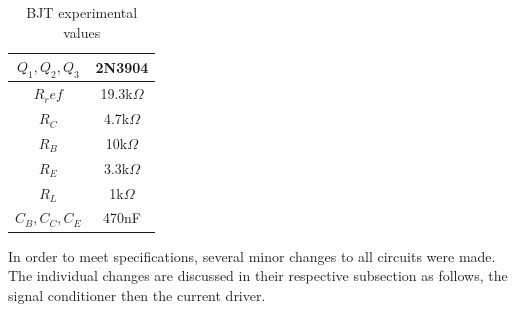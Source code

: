 \begin{table}[H]
	\centering
	\caption{BJT experimental values}
	\label{tab:bjtexp}
	\begin{tabular}{cc}
		$Q_1, Q_2, Q_3$ & 2N3904        \\ \hline
		$R_ref$         & 19.3k$\Omega$ \\ \hline
		$R_C$           & 4.7k$\Omega$  \\ \hline
		$R_B$           & 10k$\Omega$   \\ \hline 
		$R_E$           & 3.3k$\Omega$  \\ \hline 
		$R_L$           & 1k$\Omega$    \\ \hline
		$C_B, C_C, C_E$ & 470nF        \hline
	\end{tabular}
\end{table}

In order to meet specifications, several minor changes to all circuits were made. The individual changes are discussed in their respective subsection as follows, the signal conditioner then the current driver.


%




